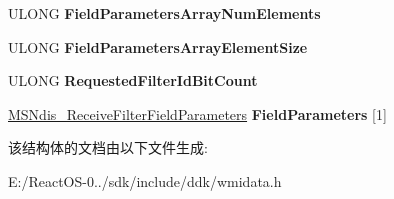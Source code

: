 \begin{DoxyCompactItemize}
U\+L\+O\+NG {\bfseries Field\+Parameters\+Array\+Num\+Elements}
\item 
\mbox{\label{struct___m_s_ndis___receive_filter_parameters_a555aed6891ef460922953e1f7121f31c}} 
U\+L\+O\+NG {\bfseries Field\+Parameters\+Array\+Element\+Size}
\item 
\mbox{\label{struct___m_s_ndis___receive_filter_parameters_a09841ff7553869ec999db6e55252a452}} 
U\+L\+O\+NG {\bfseries Requested\+Filter\+Id\+Bit\+Count}
\item 
\mbox{\label{struct___m_s_ndis___receive_filter_parameters_a4ec7f3fbcde9e98e7e5c7582cb00fc49}} 
\hyperlink{struct___m_s_ndis___receive_filter_field_parameters}{M\+S\+Ndis\+\_\+\+Receive\+Filter\+Field\+Parameters} {\bfseries Field\+Parameters} \mbox{[}1\mbox{]}
\end{DoxyCompactItemize}


该结构体的文档由以下文件生成\+:\begin{DoxyCompactItemize}
\item 
E\+:/\+React\+O\+S-\/0../sdk/include/ddk/wmidata.\+h\end{DoxyCompactItemize}
